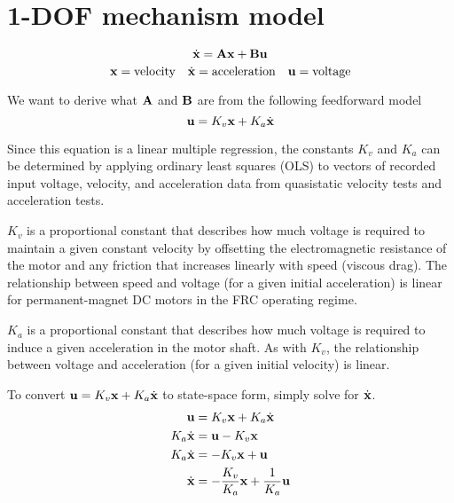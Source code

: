 \section{1-DOF mechanism model}
\begin{equation*}
  \dot{\mathbf{x}} = \mathbf{A}\mathbf{x} + \mathbf{B}\mathbf{u}
\end{equation*}
\begin{equation*}
  \mathbf{x} = \text{velocity}
  \quad
  \dot{\mathbf{x}} = \text{acceleration}
  \quad
  \mathbf{u} = \text{voltage}
\end{equation*}

We want to derive what $\mathbf{A}$ and $\mathbf{B}$ are from the following
feedforward model
\begin{equation*}
  \mathbf{u} = K_v \mathbf{x} + K_a \dot{\mathbf{x}}
\end{equation*}

Since this equation is a linear multiple regression, the constants $K_v$ and
$K_a$ can be determined by applying ordinary least squares (OLS) to vectors of
recorded input voltage, velocity, and acceleration data from quasistatic
velocity tests and acceleration tests.

$K_v$ is a proportional constant that describes how much voltage is required to
maintain a given constant velocity by offsetting the electromagnetic resistance
of the motor and any friction that increases linearly with speed (viscous drag).
The relationship between speed and voltage (for a given initial acceleration) is
linear for permanent-magnet DC motors in the FRC operating regime.

$K_a$ is a proportional constant that describes how much voltage is required to
induce a given acceleration in the motor shaft. As with $K_v$, the relationship
between voltage and acceleration (for a given initial velocity) is linear.

To convert $\mathbf{u} = K_v \mathbf{x} + K_a \dot{\mathbf{x}}$ to state-space form,
simply solve for $\dot{\mathbf{x}}$.
\begin{align*}
  \mathbf{u} &= K_v \mathbf{x} + K_a \dot{\mathbf{x}} \\
  K_a \dot{\mathbf{x}} &= \mathbf{u} - K_v \mathbf{x} \\
  K_a \dot{\mathbf{x}} &= -K_v \mathbf{x} + \mathbf{u} \\
  \dot{\mathbf{x}} &= -\frac{K_v}{K_a} \mathbf{x} + \frac{1}{K_a} \mathbf{u}
\end{align*}

